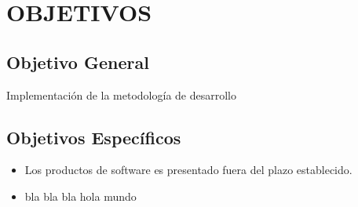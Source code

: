 \section{OBJETIVOS}
\subsection{Objetivo General}
Implementación de la metodología de desarrollo
\subsection{Objetivos Específicos}
\begin{itemize}
	\item 
	Los productos de software es presentado fuera del plazo establecido.
	\item
	bla bla bla hola mundo
\end{itemize}